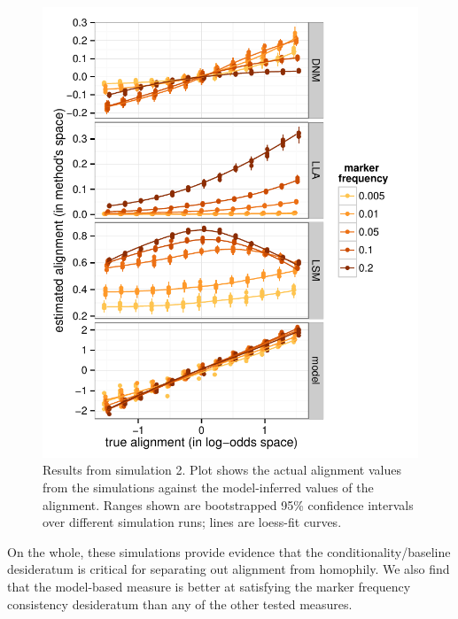 \documentclass{acm_proc_article-sp}
\begin{document}
\begin{figure}
\centering
\includegraphics[width=\columnwidth]{graphics/www2016_simulation2b_crossiter.pdf}
\caption{Results from simulation 2. Plot shows the actual alignment values from the simulations against the model-inferred values of the alignment. Ranges shown are bootstrapped 95\% confidence intervals over different simulation runs; lines are loess-fit curves.}\label{fig:sim2}
\end{figure}

On the whole, these simulations provide evidence that the conditionality/baseline desideratum is critical for separating out alignment from homophily.  We also find that the model-based measure is better at satisfying the marker frequency consistency desideratum than any of the other tested measures.


\end{document}

